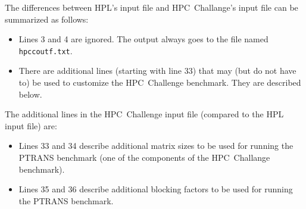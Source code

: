 \documentclass[twocolumn]{article}
\begin{document}
The differences between HPL's input file and HPC~Challange's input file can
be summarized as follows:

\begin{itemize}
\item Lines 3 and 4 are ignored. The output always goes to the file named \texttt{hpccoutf.txt}.
\item There are additional lines (starting with line 33) that may (but
do not have to) be used to customize the HPC~Challenge benchmark. They
are described below.
\end{itemize}

The additional lines in the HPC~Challenge input file (compared to the
HPL input file) are:

\begin{itemize}
\item Lines 33 and 34 describe additional matrix sizes to be used for
running the PTRANS benchmark (one of the components of the
HPC~Challange benchmark).
\item Lines 35 and 36 describe additional blocking factors to be used
for running the PTRANS benchmark.
\end{itemize}
\end{document}
